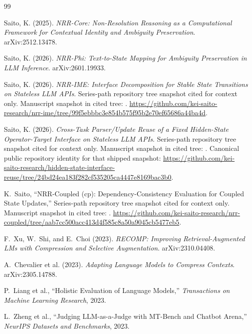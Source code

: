\documentclass[11pt,a4paper]{article}
\begin{document}
\begin{thebibliography}{99}\sloppy

Saito, K. (2025).
\textit{NRR-Core: Non-Resolution Reasoning as a Computational Framework for Contextual Identity and Ambiguity Preservation}.
arXiv:2512.13478.

Saito, K. (2026).
\textit{NRR-Phi: Text-to-State Mapping for Ambiguity Preservation in LLM Inference}.
arXiv:2601.19933.

Saito, K. (2026).
\textit{NRR-IME: Interface Decomposition for Stable State Transitions on Stateless LLM APIs}.
Series-path repository tree snapshot cited for context only. Manuscript snapshot in cited tree: . \url{https://github.com/kei-saito-research/nrr-ime/tree/99f5ebbbc3e854b575f95b2e70ef65686a44ba4d}.

Saito, K. (2026).
\textit{Cross-Task Parser/Update Reuse of a Fixed Hidden-State Operator-Target Interface on Stateless LLM APIs}.
Series-path repository tree snapshot cited for context only. Manuscript snapshot in cited tree: . Canonical public repository identity for that shipped snapshot: \url{https://github.com/kei-saito-research/hidden-state-interface-reuse/tree/24bd24ea183f282cf535205ca4447e8169bac3b0}.

K.~Saito,
\newblock ``NRR-Coupled (cp): Dependency-Consistency Evaluation for Coupled State Updates,''
\newblock Series-path repository tree snapshot cited for context only. Manuscript snapshot in cited tree:
.
\url{https://github.com/kei-saito-research/nrr-coupled/tree/aab7cc500acc413d4f585c8a50a9045cb5477eb5}.

F.~Xu, W.~Shi, and E.~Choi (2023).
\textit{RECOMP: Improving Retrieval-Augmented LMs with Compression and Selective Augmentation}.
arXiv:2310.04408.

A.~Chevalier et al. (2023). \textit{Adapting Language Models to Compress Contexts}. arXiv:2305.14788.

P.~Liang et al.,
\newblock ``Holistic Evaluation of Language Models,''
\newblock \emph{Transactions on Machine Learning Research}, 2023.

L.~Zheng et al.,
\newblock ``Judging LLM-as-a-Judge with MT-Bench and Chatbot Arena,''
\newblock \emph{NeurIPS Datasets and Benchmarks}, 2023.


\end{thebibliography}
\end{document}
